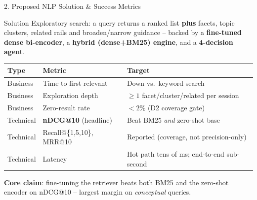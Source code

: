 \documentclass[10pt,aspectratio=169]{beamer}
\begin{document}
\begin{frame}{2. Proposed NLP Solution \& Success Metrics}
\begin{block}{Solution}
Exploratory search: a query returns a ranked list \textbf{plus} facets, topic clusters, related rails and broaden/narrow guidance -- backed by a \textbf{fine-tuned dense bi-encoder}, a \textbf{hybrid (dense+BM25) engine}, and a \textbf{4-decision agent}.
\end{block}

\begin{table}[h]
\centering\small
\begin{tabular}{lll}
\toprule
\textbf{Type} & \textbf{Metric} & \textbf{Target} \\
\midrule
Business & Time-to-first-relevant & Down vs.\ keyword search \\
Business & Exploration depth & $\geq 1$ facet/cluster/related per session \\
Business & Zero-result rate & $<2\%$ (D2 coverage gate) \\
Technical & \textbf{nDCG@10} (headline) & Beat BM25 \emph{and} zero-shot base \\
Technical & Recall@\{1,5,10\}, MRR@10 & Reported (coverage, not precision-only) \\
Technical & Latency & Hot path tens of ms; end-to-end sub-second \\
\bottomrule
\end{tabular}
\end{table}

\footnotesize \textbf{Core claim}: fine-tuning the retriever beats both BM25 and the zero-shot encoder on nDCG@10 -- largest margin on \emph{conceptual} queries.
\end{frame}
\end{document}

